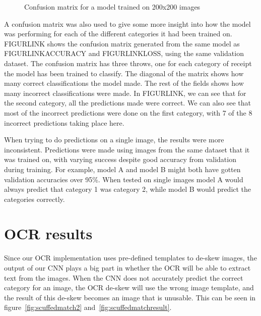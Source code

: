 \begin{figure}[h]
    \caption{Confusion matrix for a model trained on 200x200 images}
    \label{fig:200confusion}
\end{figure}

A confusion matrix was also used to give some more insight into how the model was performing for each of the different categories it had been trained on.
FIGURLINK shows the confusion matrix generated from the same model as FIGURLINKACCURACY and FIGURLINKLOSS, using the same validation dataset.
The confusion matrix has three throws, one for each category of receipt the model has been trained to classify.
The diagonal of the matrix shows how many correct classifications the model made.
The rest of the fields shows how many incorrect classifications were made.
In FIGURLINK, we can see that for the second category, all the predictions made were correct.
We can also see that most of the incorrect predictions were done on the first category, with 7 of the 8 incorrect predictions taking place here.

When trying to do predictions on a single image, the results were more inconsistent.
Predictions were made using images from the same dataset that it was trained on, with varying success despite good accuracy from validation during training.
For example, model A and model B might both have gotten validation accuracies over 95\%.
When tested on single images model A would always predict that category 1 was category 2, while model B would predict the categories correctly.

\section{OCR results}\label{sec:ocr-results}
Since our OCR implementation uses pre-defined templates to de-skew images, the output of our CNN plays a big part in whether the OCR will be able to extract text from the images.
When the CNN does not accurately predict the correct category for an image, the OCR de-skew will use the wrong image template, and the result of this de-skew becomes an image that is unusable.
This can be seen in figure~\ref{fig:scuffedmatch2} and~\ref{fig:scuffedmatchresult}.

